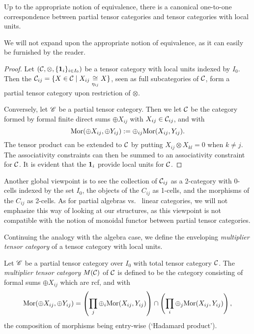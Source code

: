 
\begin{Lem} Up to the appropriate notion of equivalence, there is a canonical one-to-one correspondence between partial tensor categories and tensor categories with local units. 
\end{Lem}

We will not expand upon the appropriate notion of equivalence, as it can easily be furnished by the reader. %

\begin{proof} Let $(\mathcal{C},\otimes,\{\mathbf{1}_i\}_{i\in I_0})$ be a tensor category with local units indexed by $I_0$. Then the $\mathcal{C}_{ij} = \{X \in \mathcal{C}\mid X_{ij} \underset{\eta_{ij}}{\cong} X\}$, seen as full subcategories of $\mathcal{C}$, form a partial tensor category upon restriction of $\otimes$.

Conversely, let $\mathscr{C}$ be a partial tensor category. Then we let $\mathcal{C}$ be the category formed by formal finite direct sums $\oplus X_{ij}$ with $X_{ij}\in \mathcal{C}_{ij}$, and with \[\mathrm{Mor}(\oplus X_{ij},\oplus Y_{ij}) := \oplus_{ij} \mathrm{Mor}(X_{ij},Y_{ij}).\] The tensor product can be extended to $\mathcal{C}$ by putting $X_{ij} \otimes X_{kl} = 0$ when $k\neq j$. The associativity constraints can then be summed to an associativity constraint for $\mathcal{C}$. It is evident that the $\mathbf{1}_i$ provide local units for $\mathcal{C}$. 
\end{proof}

\begin{Rem} Another global viewpoint is to see the collection of $\mathcal{C}_{ij}$ as a 2-category with 0-cells indexed by the set $I_0$, the objects of the $C_{ij}$ as 1-cells, and  the morphisms of the $C_{ij}$ as 2-cells. As for partial algebras vs.~ linear categories, we will not emphasize this way of looking at our structures, as this viewpoint is not compatible with the notion of monoidal functor between partial tensor categories.
\end{Rem} 

Continuing the analogy with the algebra case, we define the enveloping \emph{multiplier tensor category} of a tensor category with local units. 

\begin{Def} Let $\mathscr{C}$ be a partial tensor category over $I_0$ with total tensor category $\mathcal{C}$. The \emph{multiplier tensor category} $M(\mathcal{C})$ of $\mathcal{C}$ is defined to be the category consisting of formal sums $\oplus X_{ij}$ which are rcf, and with \[\mathrm{Mor}(\oplus X_{ij},\oplus Y_{ij}) = \left(\prod_j\oplus_i  \mathrm{Mor}(X_{ij},Y_{ij}) \right) \cap \left(\prod_i\oplus_j \mathrm{Mor}(X_{ij},Y_{ij})\right),\] the composition of morphisms being entry-wise (`Hadamard product'). 
\end{Def}

